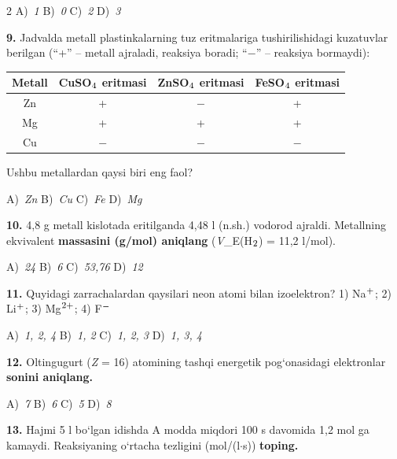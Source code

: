 \documentclass[11pt,a4paper]{article}
\renewcommand{\textsubscript}[1]{\ensuremath{_{\text{\fontsize{8}{8}\selectfont #1}}}}
\renewcommand{\textsuperscript}[1]{\ensuremath{^{\text{\fontsize{8}{8}\selectfont #1}}}}
\begin{document}
\begin{multicols}{2}
\noindent A)~\textsl{1} \hfill B)~\textsl{0} \hfill C)~\textsl{2} \hfill D)~\textsl{3}\par
\vspace{4pt}
\noindent\textbf{9.} Jadvalda metall plastinkalarning tuz eritmalariga tushirilishidagi kuzatuvlar berilgan (``+'' -- metall ajraladi, reaksiya boradi; ``$-$'' -- reaksiya bormaydi):
\begin{center}
\renewcommand{\arraystretch}{1.15}
\begin{tabular}{|c|c|c|c|}\hline
\textbf{Metall} & \textbf{CuSO\textsubscript{4} eritmasi} & \textbf{ZnSO\textsubscript{4} eritmasi} & \textbf{FeSO\textsubscript{4} eritmasi} \\ \hline
Zn & + & $-$ & + \\ \hline
Mg & + & + & + \\ \hline
Cu & $-$ & $-$ & $-$ \\ \hline
\end{tabular}
\end{center}
Ushbu metallardan qaysi biri eng faol?

\noindent A)~\textsl{Zn} \hfill B)~\textsl{Cu} \hfill C)~\textsl{Fe} \hfill D)~\textsl{Mg}\par
\vspace{4pt}
\noindent\textbf{10.} 4,8 g metall kislotada eritilganda 4,48 l (n.sh.) vodorod ajraldi. Metallning ekvivalent \textbf{massasini (g/mol) aniqlang} (\textit{V}\_E(H\textsubscript{2}) = 11,2 l/mol).

\noindent A)~\textsl{24} \hfill B)~\textsl{6} \hfill C)~\textsl{53,76} \hfill D)~\textsl{12}\par
\vspace{4pt}
\noindent\textbf{11.} Quyidagi zarrachalardan qaysilari neon atomi bilan izoelektron? 1) Na\textsuperscript{+}; 2) Li\textsuperscript{+}; 3) Mg\textsuperscript{2+}; 4) F\textsuperscript{$-$}

\noindent A)~\textsl{1, 2, 4} \hfill B)~\textsl{1, 2} \hfill C)~\textsl{1, 2, 3} \hfill D)~\textsl{1, 3, 4}\par
\vspace{4pt}
\noindent\textbf{12.} Oltingugurt (\textit{Z} = 16) atomining tashqi energetik pog`onasidagi elektronlar \textbf{sonini aniqlang.}

\noindent A)~\textsl{7} \hfill B)~\textsl{6} \hfill C)~\textsl{5} \hfill D)~\textsl{8}\par
\vspace{4pt}
\noindent\textbf{13.} Hajmi 5 l bo`lgan idishda A modda miqdori 100 s davomida 1,2 mol ga kamaydi. Reaksiyaning o`rtacha tezligini (mol/(l$\cdot$s)) \textbf{toping.}


\end{multicols}
\end{document}
